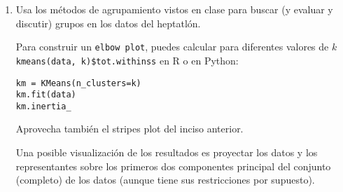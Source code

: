 \documentclass[12pt]{book}
\newcommand {\?}{?`}
\begin{document}
\begin{enumerate}
\item
Usa los m\'etodos de agrupamiento vistos en clase para buscar (y evaluar y discutir) grupos en los datos  del heptatl\'on.

 
Para construir un {\tt elbow plot}, puedes calcular para diferentes valores de $k$
\verb|kmeans(data, k)$tot.withinss|  en {\cal R} o en Python: 
\begin{verbatim}
km = KMeans(n_clusters=k)
km.fit(data)
km.inertia_
\end{verbatim}
Aprovecha tambi\'en el stripes plot del inciso anterior. 

Una posible visualizaci\'on de los resultados es proyectar los datos y los representantes sobre los primeros dos componentes principal del conjunto (completo) de los datos (aunque tiene sus restricciones por supuesto).

\end{enumerate}  




\item
\end{document}
